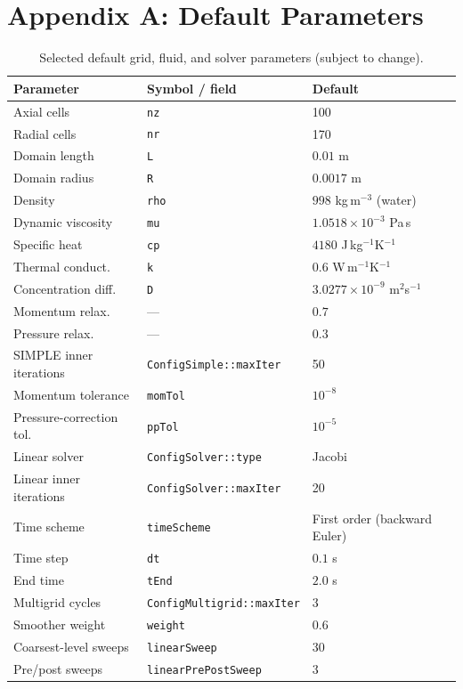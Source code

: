 \documentclass[11pt]{article}
\begin{document}
\section*{Appendix A: Default Parameters}
\begin{table}[h]
\centering
\caption{Selected default grid, fluid, and solver parameters (subject to change).}
\begin{tabular}{@{}lll@{}}
\toprule
\textbf{Parameter} & \textbf{Symbol / field} & \textbf{Default} \\
\midrule
Axial cells        & \texttt{nz}  & 100 \\
Radial cells       & \texttt{nr}  & 170 \\
Domain length      & \texttt{L}   & \(0.01\) m \\
Domain radius      & \texttt{R}   & \(0.0017\) m \\
Density            & \texttt{rho} & \(998\) kg\,m\(^{-3}\) (water) \\
Dynamic viscosity  & \texttt{mu}  & \(1.0518\times10^{-3}\) Pa\,s \\
Specific heat      & \texttt{cp}  & \(4180\) J\,kg\(^{-1}\)K\(^{-1}\) \\
Thermal conduct.   & \texttt{k}   & \(0.6\) W\,m\(^{-1}\)K\(^{-1}\) \\
Concentration diff.& \texttt{D}   & \(3.0277\times10^{-9}\) m\(^2\)s\(^{-1}\) \\
Momentum relax.    & ---          & \(0.7\) \\
Pressure relax.    & ---          & \(0.3\) \\
\midrule
SIMPLE inner iterations   & \texttt{ConfigSimple::maxIter}   & 50 \\
Momentum tolerance        & \texttt{momTol}                  & \(10^{-8}\) \\
Pressure-correction tol.  & \texttt{ppTol}                   & \(10^{-5}\) \\
Linear solver             & \texttt{ConfigSolver::type}      & Jacobi \\
Linear inner iterations   & \texttt{ConfigSolver::maxIter}   & 20 \\
Time scheme               & \texttt{timeScheme}              & First order (backward Euler) \\
Time step                 & \texttt{dt}                      & \(0.1\) s \\
End time                  & \texttt{tEnd}                    & \(2.0\) s \\
\midrule
Multigrid cycles          & \texttt{ConfigMultigrid::maxIter} & 3 \\
Smoother weight           & \texttt{weight}                   & 0.6 \\
Coarsest-level sweeps     & \texttt{linearSweep}              & 30 \\
Pre/post sweeps           & \texttt{linearPrePostSweep}       & 3 \\
\bottomrule
\end{tabular}
\end{table}
\end{document}

